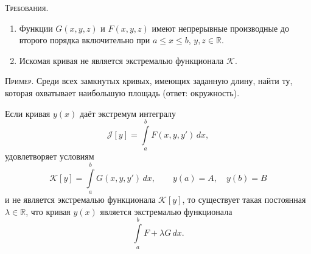 \textsc{Требования.}
\begin{enumerate}
  \item Функции $ G(x,y,z) $ и $ F(x,y,z)$ имеют непрерывные производные до
    второго порядка
    включительно при $ a\leqslant x \leqslant b $, $ y, z \in \mathbb R $.
  \item Искомая кривая не является экстремалью функционала $ \mathscr K $.
\end{enumerate}

\textsc{Пример.} Среди всех замкнутых кривых, имеющих заданную длину, найти
ту, которая охватывает наибольшую площадь (ответ: окружность).


\begin{theorem}
  Если кривая $ y(x) $ даёт экстремум интегралу  
  \[
    \mathscr J[y] = \int\limits_{a}^{b}F(x, y, y')\,dx,
  \]
 удовлетворяет условиям  
 \[
   \mathscr K[y] = \int\limits_{a}^{b}G(x, y, y')\,dx, \qquad y(a) = A, \quad
   y(b) = B
 \]
 и не является экстремалью функционала $ \mathscr K[y] $, то существует такая
 постоянная $ \lambda \in \mathbb R $, что кривая $ y(x) $ является экстремалью
 функционала 
 \[
     \int\limits_{a}^{b} F + \lambda G\,dx.
 \] 
\end{theorem}
